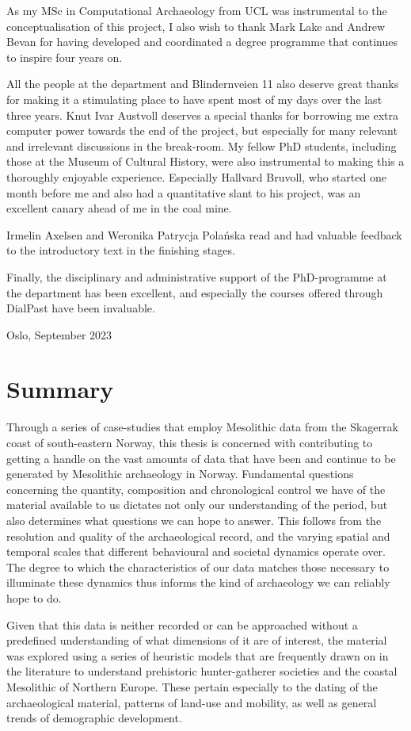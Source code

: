 As my MSc in Computational Archaeology from UCL was instrumental to the conceptualisation of this project, I also wish to thank Mark Lake and Andrew Bevan for having developed and coordinated a degree programme that continues to inspire four years on.

All the people at the department and Blindernveien 11 also deserve great thanks for making it a stimulating place to have spent most of my days over the last three years. Knut Ivar Austvoll deserves a special thanks for borrowing me extra computer power towards the end of the project, but especially for many relevant and irrelevant discussions in the break-room. My fellow PhD students, including those at the Museum of Cultural History, were also instrumental to making this a thoroughly enjoyable experience. Especially Hallvard Bruvoll, who started one month before me and also had a quantitative slant to his project, was an excellent canary ahead of me in the coal mine.

Irmelin Axelsen and Weronika Patrycja Polańska read and had valuable feedback to the introductory text in the finishing stages.

Finally, the disciplinary and administrative support of the PhD-programme at the department has been excellent, and especially the courses offered through DialPast have been invaluable.

\bigskip
\noindent
Oslo, September 2023
\newpage

\section*{Summary}
Through a series of case-studies that employ Mesolithic data from the Skagerrak coast of south-eastern Norway, this thesis is concerned with contributing to getting a handle on the vast amounts of data that have been and continue to be generated by Mesolithic archaeology in Norway. Fundamental questions concerning the quantity, composition and chronological control we have of the material available to us dictates not only our understanding of the period, but also determines what questions we can hope to answer. This follows from the resolution and quality of the archaeological record, and the varying spatial and temporal scales that different behavioural and societal dynamics operate over. The degree to which the characteristics of our data matches those necessary to illuminate these dynamics thus informs the kind of archaeology we can reliably hope to do.   

Given that this data is neither recorded or can be approached without a predefined understanding of what dimensions of it are of interest, the material was explored using a series of heuristic models that are frequently drawn on in the literature to understand prehistoric hunter-gatherer societies and the coastal Mesolithic of Northern Europe. These pertain especially to the dating of the archaeological material, patterns of land-use and mobility, as well as general trends of demographic development. 

